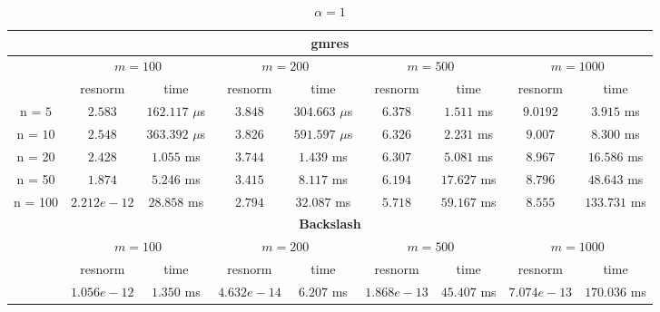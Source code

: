 \begin{table}
\centering
\small
\caption{$\alpha = 1$}
\begin{threeparttable}
{\def\arraystretch{1.3}
\begin{tabular}{ccccccccc}
  \toprule
  \multicolumn{9}{c}{\textbf{gmres}}\\
\midrule
& \multicolumn{2}{c}{$m = 100$}&\multicolumn{2}{c}{$m = 200$}&\multicolumn{2}{c}{$m = 500$}&\multicolumn{2}{c}{$m = 1000$}\\
\midrule
& resnorm & time & resnorm & time & resnorm & time &resnorm & time \\
\midrule
n = $5$ & $2.583$ & $162.117$ $\mu $s & $3.848$ & $304.663$ $\mu$s & $6.378$ & $1.511$ ms & $9.0192$ & $3.915$ ms\\
n = $10$ & $2.548$ & $363.392$ $\mu$s & $3.826$ & $591.597$ $\mu$s & $6.326$ & $2.231$ ms & $9.007$ & $8.300$  ms\\
n = 20 & $2.428$ & $1.055$ ms & $3.744$ & $1.439$ ms & $6.307$ & $5.081$ ms & $8.967$ & $16.586$ ms\\
n = 50 & $1.874$ & $5.246$ ms & $3.415$ & $8.117$ ms & $6.194$ & $17.627$ ms & $8.796$ & $48.643$ ms\\
n = 100 & $2.212e-12$ & $28.858$ ms & $2.794$ & $32.087$ ms & $5.718$ & $59.167$ ms & $8.555$ & $133.731$ ms\\
\bottomrule
\multicolumn{9}{c}{\textbf{Backslash}}\\
\midrule
& \multicolumn{2}{c}{$m = 100$} & \multicolumn{2}{c}{$m = 200$} & \multicolumn{2}{c}{$m = 500$} & \multicolumn{2}{c}{$m = 1000$}\\
\midrule
& resnorm & time & resnorm & time & resnorm & time & resnorm & time\\
\midrule
 & $1.056e-12$ & $1.350$ ms & $4.632e-14$ & $6.207$ ms & $1.868e-13$ & $45.407$ ms & $7.074e-13$ & $170.036$ ms \\
\bottomrule

\end{tabular}
}
\end{threeparttable}
\end{table}



